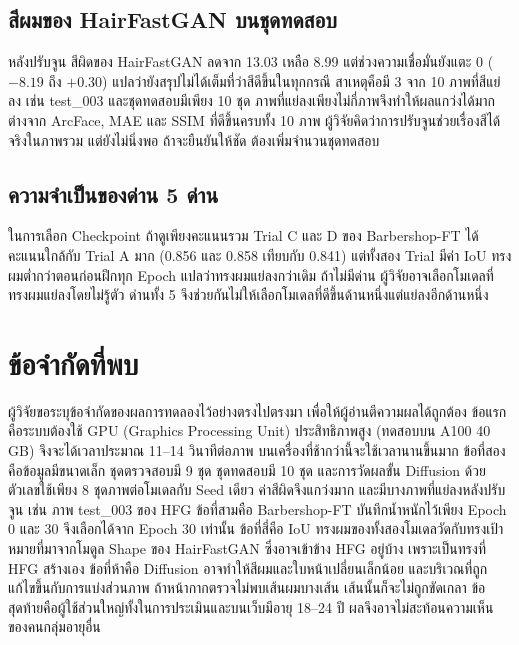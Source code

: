 \subsection{สีผมของ HairFastGAN บนชุดทดสอบ}

หลังปรับจูน สีผิดของ HairFastGAN ลดจาก 13.03 เหลือ 8.99 แต่ช่วงความเชื่อมั่นยังแตะ 0 ($-8.19$ ถึง $+0.30$)
แปลว่ายังสรุปไม่ได้เต็มที่ว่าสีดีขึ้นในทุกกรณี
สาเหตุคือมี 3 จาก 10 ภาพที่สีแย่ลง เช่น test\_003 และชุดทดสอบมีเพียง 10 ชุด
ภาพที่แย่ลงเพียงไม่กี่ภาพจึงทำให้ผลแกว่งได้มาก
ต่างจาก ArcFace, MAE และ SSIM ที่ดีขึ้นครบทั้ง 10 ภาพ
ผู้วิจัยคิดว่าการปรับจูนช่วยเรื่องสีได้จริงในภาพรวม แต่ยังไม่นิ่งพอ
ถ้าจะยืนยันให้ชัด ต้องเพิ่มจำนวนชุดทดสอบ

\subsection{ความจำเป็นของด่าน 5 ด่าน}

ในการเลือก Checkpoint ถ้าดูเพียงคะแนนรวม Trial C และ D ของ Barbershop-FT
ได้คะแนนใกล้กับ Trial A มาก (0.856 และ 0.858 เทียบกับ 0.841)
แต่ทั้งสอง Trial มีค่า IoU ทรงผมต่ำกว่าตอนก่อนฝึกทุก Epoch แปลว่าทรงผมแย่ลงกว่าเดิม
ถ้าไม่มีด่าน ผู้วิจัยอาจเลือกโมเดลที่ทรงผมแย่ลงโดยไม่รู้ตัว
ด่านทั้ง 5 จึงช่วยกันไม่ให้เลือกโมเดลที่ดีขึ้นด้านหนึ่งแต่แย่ลงอีกด้านหนึ่ง

\section{ข้อจำกัดที่พบ}

ผู้วิจัยขอระบุข้อจำกัดของผลการทดลองไว้อย่างตรงไปตรงมา เพื่อให้ผู้อ่านตีความผลได้ถูกต้อง
ข้อแรกคือระบบต้องใช้ GPU (Graphics Processing Unit) ประสิทธิภาพสูง (ทดสอบบน A100 40 GB) จึงจะได้เวลาประมาณ 11--14 วินาทีต่อภาพ
บนเครื่องที่ช้ากว่านี้จะใช้เวลานานขึ้นมาก
ข้อที่สองคือข้อมูลมีขนาดเล็ก ชุดตรวจสอบมี 9 ชุด ชุดทดสอบมี 10 ชุด
และการวัดผลขั้น Diffusion ด้วยตัวเลขใช้เพียง 8 ชุดภาพต่อโมเดลกับ Seed เดียว
ค่าสีผิดจึงแกว่งมาก และมีบางภาพที่แย่ลงหลังปรับจูน เช่น ภาพ test\_003 ของ HFG
ข้อที่สามคือ Barbershop-FT บันทึกน้ำหนักไว้เพียง Epoch 0 และ 30 จึงเลือกได้จาก Epoch 30 เท่านั้น
ข้อที่สี่คือ IoU ทรงผมของทั้งสองโมเดลวัดกับทรงเป้าหมายที่มาจากโมดูล Shape ของ HairFastGAN
ซึ่งอาจเข้าข้าง HFG อยู่บ้าง เพราะเป็นทรงที่ HFG สร้างเอง
ข้อที่ห้าคือ Diffusion อาจทำให้สีผมและใบหน้าเปลี่ยนเล็กน้อย
และบริเวณที่ถูกแก้ไขขึ้นกับการแบ่งส่วนภาพ ถ้าหน้ากากตรวจไม่พบเส้นผมบางเส้น เส้นนั้นก็จะไม่ถูกขัดเกลา
ข้อสุดท้ายคือผู้ใช้ส่วนใหญ่ทั้งในการประเมินและบนเว็บมีอายุ 18--24 ปี
ผลจึงอาจไม่สะท้อนความเห็นของคนกลุ่มอายุอื่น

